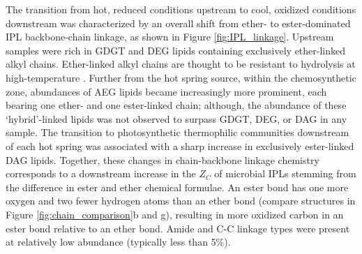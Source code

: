 The transition from hot, reduced conditions upstream to cool, oxidized conditions downstream was characterized by an overall shift from ether- to ester-dominated IPL backbone-chain linkage, as shown in Figure \ref{fig:IPL_linkage}. Upstream samples were rich in GDGT and DEG lipids containing exclusively ether-linked alkyl chains. Ether-linked alkyl chains are thought to be resistant to hydrolysis at high-temperature \citep{daniel2000biomolecular}. Further from the hot spring source, within the chemosynthetic zone, abundances of AEG lipids became increasingly more prominent, each bearing one ether- and one ester-linked chain; although, the abundance of these `hybrid'-linked lipids was not observed to surpass GDGT, DEG, or DAG in any sample. The transition to photosynthetic thermophilic communities downstream of each hot spring was associated with a sharp increase in exclusively ester-linked DAG lipids. Together, these changes in chain-backbone linkage chemistry corresponds to a downstream increase in the $Z_{C}$ of microbial IPLs stemming from the difference in ester and ether chemical formulae. An ester bond has one more oxygen and two fewer hydrogen atoms than an ether bond (compare structures in Figure \ref{fig:chain_comparison}b and g), resulting in more oxidized carbon in an ester bond relative to an ether bond. Amide and C-C linkage types were present at relatively low abundance (typically less than 5\%).


